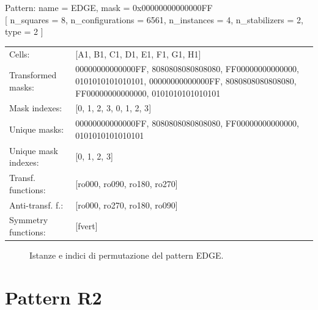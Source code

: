 \begin{tcolorbox}[sharp corners, fontupper=\ttfamily\small, colback=white]
  \noindent Pattern: name = EDGE, mask = 0x00000000000000FF\\
  {[} n\_squares = 8, n\_configurations = 6561,
  n\_instances = 4, n\_stabilizers = 2, type = 2 { ]}\\[1.0ex]
  \begin{tabularx}{\textwidth}{@{} p{3.5cm} X @{}}
    Cells:               & {[}A1, B1, C1, D1, E1, F1, G1, H1{]}\\[0.5ex]
    Transformed masks:   & 00000000000000FF, 8080808080808080, FF00000000000000, 0101010101010101, 00000000000000FF, 8080808080808080, FF00000000000000, 0101010101010101\\[0.5ex]
    Mask indexes:        & {[}0, 1, 2, 3, 0, 1, 2, 3{]}\\[0.5ex]
    Unique masks:        & 00000000000000FF, 8080808080808080, FF00000000000000, 0101010101010101\\[0.5ex]
    Unique mask indexes: & {[}0, 1, 2, 3{]}\\[0.5ex]
    Transf. functions:   & {[}ro000, ro090, ro180, ro270{]}\\[0.5ex]
    Anti-transf. f.:     & {[}ro000, ro270, ro180, ro090{]}\\[0.5ex]
    Symmetry functions:  & {[}fvert{]}\\[0.5ex]
  \end{tabularx}
\end{tcolorbox}

\begin{figure}[htbp]
  \centering
   \hfill
   \hfill
   \hfill
  \vspace{0.3cm}
   \hfill
   \hfill
   \hfill
  \caption{Istanze e indici di permutazione del pattern EDGE.}
\end{figure}

\newpage

\section{Pattern R2}


